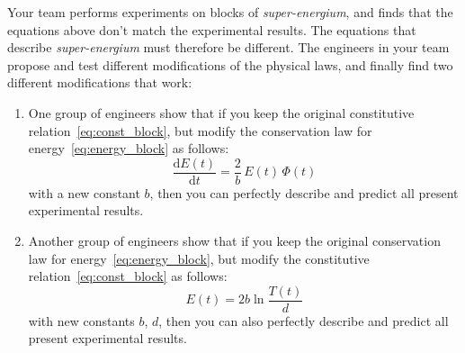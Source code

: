 \documentclass[a4paper,12pt,%
onecolumn,oneside,%
british%
]{memoir}
\newcommand*{\di}{\mathrm{d}}%
\renewcommand*{\|}[1][]{\nonscript\:#1\vert\nonscript\:\mathopen{}}
\newcommand*{\dt}{\di t}
\newcommand*{\yE}{E}
\newcommand*{\yH}{\varPhi}%
\newcommand*{\yT}{T}%
\begin{document}
Your team performs experiments on blocks of \emph{super-energium}, and finds that the equations above don't match the experimental results. The equations that describe \emph{super-energium} must therefore be different. The engineers in your team propose and test different modifications of the physical laws, and finally find two different modifications that work:
%
%
\begin{enumerate}[label=(\Alph*)]
\item\label{item:team_A} One group of engineers show that if you keep the original constitutive relation~\eqref{eq:const_block}, but modify the conservation law for energy~\eqref{eq:energy_block} as follows:
  \begin{equation}
    \label{eq:energy_block_new}
     \frac{\di\yE(t)}{\dt} = \frac{2}{b}\,\yE(t)\,\yH(t)
  \end{equation}
with a new constant $b$, then you can perfectly describe and predict all present experimental results.

\item\label{item:team_B} Another group of engineers show that if you keep the original conservation law for energy~\eqref{eq:energy_block}, but modify the constitutive relation~\eqref{eq:const_block} as follows:
  \begin{equation}
    \label{eq:const_block_new}
    \yE(t) = %
     2 b \ln\frac{\yT(t)}{d}
  \end{equation}
  with new constants $b$, $d$, then you can also perfectly describe and predict all present experimental results.
\end{enumerate}
\end{document}
